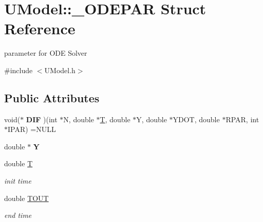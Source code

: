 \hypertarget{structUModel_1_1__ODEPAR}{}\section{U\+Model\+:\+:\+\_\+\+O\+D\+E\+P\+AR Struct Reference}
\label{structUModel_1_1__ODEPAR}


parameter for O\+DE Solver  




{\ttfamily \#include $<$U\+Model.\+h$>$}

\subsection*{Public Attributes}
\begin{DoxyCompactItemize}
\item 
\mbox{\label{structUModel_1_1__ODEPAR_a5fc201c270bf6a304386f82134417440}} 
void($\ast$ {\bfseries D\+IF} )(int $\ast$N, double $\ast$\hyperlink{structUModel_1_1__ODEPAR_a407dfd8303377097296a7288d964555e}{T}, double $\ast$Y, double $\ast$Y\+D\+OT, double $\ast$R\+P\+AR, int $\ast$I\+P\+AR) =N\+U\+LL
\item 
\mbox{\label{structUModel_1_1__ODEPAR_a3485fd61d0d7a719aaa1356d96e7ea11}} 
double $\ast$ {\bfseries Y}
\item 
\mbox{\label{structUModel_1_1__ODEPAR_a407dfd8303377097296a7288d964555e}} 
double \hyperlink{structUModel_1_1__ODEPAR_a407dfd8303377097296a7288d964555e}{T}
\begin{DoxyCompactList}\small\item\em init time \end{DoxyCompactList}\item 
\mbox{\label{structUModel_1_1__ODEPAR_af1fbeec8d118f47f0aaa246e462892e4}} 
double \hyperlink{structUModel_1_1__ODEPAR_af1fbeec8d118f47f0aaa246e462892e4}{T\+O\+UT}
\begin{DoxyCompactList}\small\item\em end time \end{DoxyCompactList}\item 
\mbox{\label{structUModel_1_1__ODEPAR_a43abf4534531cc6dad4b3ad5693b8a37}} 

\end{DoxyCompactItemize}
